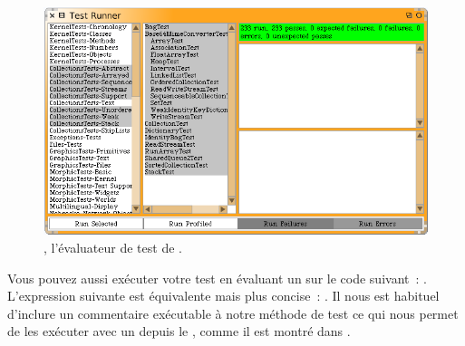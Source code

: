 \documentclass[a4paper,10pt,twoside]{book}
\begin{document}
\begin{figure}[tbh]
  \begin{center}
	\includegraphics[width=\linewidth]{test-runner}
	\caption{\sunit, l'évaluateur de test de \sq.}
	\label{fig:test-runner}
  \end{center}
\end{figure}


Vous pouvez aussi exécuter votre test en évaluant un  sur le code suivant~: . L'expression suivante est équivalente mais plus concise~: . Il nous est habituel d'inclure un commentaire exécutable à notre méthode de test ce qui nous permet de les exécuter avec un  depuis le , comme il est montré dans .

\end{document}
